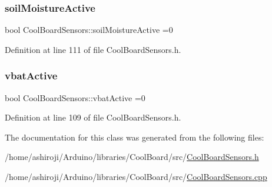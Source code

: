 \subsubsection{\texorpdfstring{soil\+Moisture\+Active}{soilMoistureActive}}
{\footnotesize\ttfamily bool Cool\+Board\+Sensors\+::soil\+Moisture\+Active =0\hspace{0.3cm}{\ttfamily [private]}}



Definition at line 111 of file Cool\+Board\+Sensors.\+h.

\mbox{\label{class_cool_board_sensors_ab0b4bbae83796b52b90f91008d383583}} 
\subsubsection{\texorpdfstring{vbat\+Active}{vbatActive}}
{\footnotesize\ttfamily bool Cool\+Board\+Sensors\+::vbat\+Active =0\hspace{0.3cm}{\ttfamily [private]}}



Definition at line 109 of file Cool\+Board\+Sensors.\+h.



The documentation for this class was generated from the following files\+:\begin{DoxyCompactItemize}
\item 
/home/ashiroji/\+Arduino/libraries/\+Cool\+Board/src/\hyperlink{_cool_board_sensors_8h}{Cool\+Board\+Sensors.\+h}\item 
/home/ashiroji/\+Arduino/libraries/\+Cool\+Board/src/\hyperlink{_cool_board_sensors_8cpp}{Cool\+Board\+Sensors.\+cpp}\end{DoxyCompactItemize}
